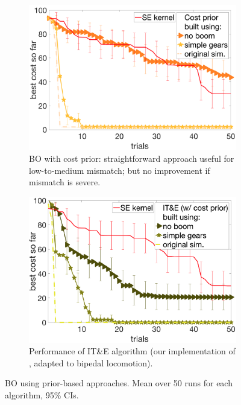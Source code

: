 \begin{figure}[t]
\begin{subfigure}[t]{0.47\textwidth}
\centering
\includegraphics[width=1.0\textwidth]{img/cost_prior_sim_versions.png}
\caption{\small{BO with cost prior: straightforward approach useful for low-to-medium mismatch; but no improvement if mismatch is severe.}}
\label{fig:cost_prior_sim_versions}
\end{subfigure}
\hspace{15px}
\begin{subfigure}[t]{0.47\textwidth}
\centering
\includegraphics[width=1.0\textwidth]{img/cully_prior_sim_versions.png}
\caption{\small{Performance of IT\&E algorithm (our implementation of \citet{cully2015robots}, adapted to bipedal locomotion).}}
\label{fig:cully_prior_sim_versions}
\end{subfigure}
\caption{\small{BO using prior-based approaches. Mean over 50 runs for each algorithm, 95\% CIs.}}
\label{fig:prior_based_bo}
\end{figure}

